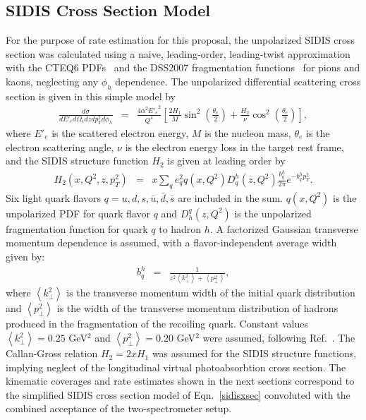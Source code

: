 \subsection{SIDIS Cross Section Model}
 For the purpose of rate estimation for this proposal, the unpolarized SIDIS cross section was calculated using a naive, leading-order, leading-twist approximation with the CTEQ6 PDFs~\cite{CTEQ6} and the DSS2007 fragmentation functions~\cite{DSS2007} for pions and kaons, neglecting any $\phi_h$ dependence. The unpolarized differential scattering cross section is given in this simple model by 
\begin{eqnarray}
  \frac{d\sigma}{dE'_e d\Omega_e dz dp_T^2 d\phi_h} &=& \frac{4\alpha^2 {E'_e}^2}{Q^4}\left[\frac{2H_1}{M} \sin^2 \left(\frac{\theta_e}{2}\right) + \frac{H_2}{\nu} \cos^2\left(\frac{\theta_e}{2}\right)\right], \label{sidisxsec}
\end{eqnarray}
where $E'_e$ is the scattered electron energy, $M$ is the nucleon mass, $\theta_e$ is the electron scattering angle, $\nu$ is the electron energy loss in the target rest frame, and the SIDIS structure function $H_2$ is given at leading order by
\begin{eqnarray}
  H_2(x, Q^2, z, p_T^2) &=& x \sum_q e_q^2 q(x,Q^2) D^h_q(z,Q^2) \frac{b_q^h}{2\pi}e^{-b_q^h p_T^2}.
\end{eqnarray}
Six light quark flavors $q = u,d,s, \bar{u}, \bar{d}, \bar{s}$ are included in the sum. $q(x,Q^2)$ is the unpolarized PDF for quark flavor $q$ and $D_h^q(z,Q^2)$ is the unpolarized fragmentation function for quark $q$ to hadron $h$. A factorized Gaussian transverse momentum dependence is assumed, with a flavor-independent average width given by:
\begin{eqnarray}
  b_q^h &=& \frac{1}{z^2\left<k^2_\perp\right> + \left<p_\perp^2 \right>}, 
\end{eqnarray}
where $\left<k^2_\perp\right>$ is the transverse momentum width of the initial quark distribution and $ \left<p_\perp^2 \right>$ is the width of the transverse momentum distribution of hadrons produced in the fragmentation of the recoiling quark. Constant values $\left<k^2_\perp\right> = 0.25$ GeV$^2$ and  $ \left<p_\perp^2 \right> = 0.20$ GeV$^2$ were assumed, following Ref.~\cite{PhysRevD.71.074006}. The Callan-Gross relation $H_2 = 2xH_1$ was assumed for the SIDIS structure functions, implying neglect of the longitudinal virtual photoabsorbtion cross section. The kinematic coverages and rate estimates shown in the next sections correspond to the simplified SIDIS cross section model of Eqn.~\eqref{sidisxsec} convoluted with the combined acceptance of the two-spectrometer setup.

